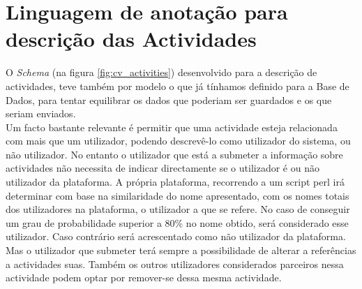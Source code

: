 \documentclass[a4paper,11pt,openright,openbib]{article}
\begin{document}
\section{Linguagem de anotação para descrição das Actividades}
O \emph{Schema} (na figura \ref{fig:cv_activities}) desenvolvido para a descrição de actividades, teve também por modelo o que já tínhamos definido para a Base de Dados, para tentar equilibrar os dados que poderiam ser guardados e os que seriam enviados.\\
Um facto bastante relevante é permitir que uma actividade esteja relacionada com mais que um utilizador, podendo descrevê-lo como utilizador do sistema, ou não utilizador. No entanto o utilizador que está a submeter a informação sobre actividades não necessita de indicar directamente se o utilizador é ou não utilizador da plataforma. A própria plataforma, recorrendo a um script perl irá determinar com base na similaridade do nome apresentado, com os nomes totais dos utilizadores na plataforma, o utilizador a que se refere. No caso de conseguir um grau de probabilidade superior a 80\% no nome obtido, será considerado esse utilizador. Caso contrário será acrescentado como não utilizador da plataforma. Mas o utilizador que submeter terá sempre a possibilidade de alterar a referências a actividades suas. Também os outros utilizadores considerados parceiros nessa actividade podem optar por remover-se dessa mesma actividade.
\end{document}
